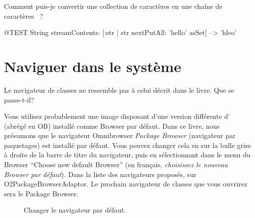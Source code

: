 \documentclass[a4paper,10pt,twoside]{book}
\begin{document}
\begin{faq}
Comment puis-je convertir une collection de caractères en une 
chaîne de caractères
~?
\end{faq}
\answer
\begin{code}{@TEST}
String streamContents: [:str | str nextPutAll: 'hello' asSet] --> 'hleo'
\end{code}

\section{Naviguer dans le système}

\begin{faq}
Le navigateur de classes ne ressemble pas à celui décrit dans le
livre. Que se passe-t-il?
\end{faq}
\answer
Vous utilisez probablement une image disposant d'une version
différente d'
(abrégé en OB) %
installé comme Browser par défaut.
Dans ce livre, nous présumons que le navigateur Omnibrowser
\emph{Package Browser} (navigateur par paquetages) est installé par
défaut.
Vous pouvez changer cela en \clickant sur la bulle grise 
à droite de la barre de titre du navigateur, puis en sélectionnant
dans le menu du Browser ``Choose new default Browser'' (en français,
\emph{choisissez le nouveau Browser par défaut}). Dans la liste des
navigateurs proposés, \clickz sur O2PackageBrowserAdaptor.
Le prochain navigateur de classes que vous ouvrirez sera le Package Browser. %

\begin{figure}[tbh]
	\centering
	\hfill
	\hfill
	\caption{Changer le navigateur par défaut.}
\end{figure}
\end{document}
